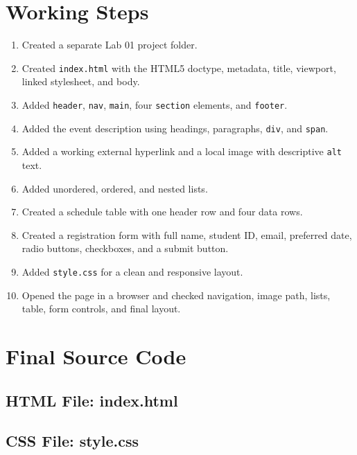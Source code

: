 \documentclass[12pt,a4paper]{article}
\begin{document}
\section{Working Steps}
\begin{enumerate}[leftmargin=1.5em]
\item Created a separate Lab 01 project folder.
\item Created \texttt{index.html} with the HTML5 doctype, metadata, title, viewport, linked stylesheet, and body.
\item Added \texttt{header}, \texttt{nav}, \texttt{main}, four \texttt{section} elements, and \texttt{footer}.
\item Added the event description using headings, paragraphs, \texttt{div}, and \texttt{span}.
\item Added a working external hyperlink and a local image with descriptive \texttt{alt} text.
\item Added unordered, ordered, and nested lists.
\item Created a schedule table with one header row and four data rows.
\item Created a registration form with full name, student ID, email, preferred date, radio buttons, checkboxes, and a submit button.
\item Added \texttt{style.css} for a clean and responsive layout.
\item Opened the page in a browser and checked navigation, image path, lists, table, form controls, and final layout.
\end{enumerate}

\section{Final Source Code}
\subsection{HTML File: index.html}


\subsection{CSS File: style.css}

\end{document}
